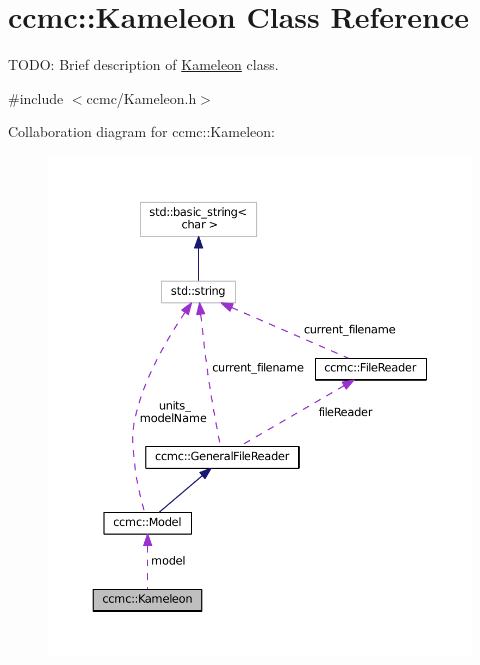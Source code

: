 \hypertarget{classccmc_1_1_kameleon}{\section{ccmc\-:\-:Kameleon Class Reference}
\label{classccmc_1_1_kameleon}
}


T\-O\-D\-O\-: Brief description of \hyperlink{classccmc_1_1_kameleon}{Kameleon} class.  




{\ttfamily \#include $<$ccmc/\-Kameleon.\-h$>$}



Collaboration diagram for ccmc\-:\-:Kameleon\-:
\nopagebreak
\begin{figure}[H]
\begin{center}
\leavevmode
\includegraphics[width=350pt]{classccmc_1_1_kameleon__coll__graph}
\end{center}
\end{figure}
